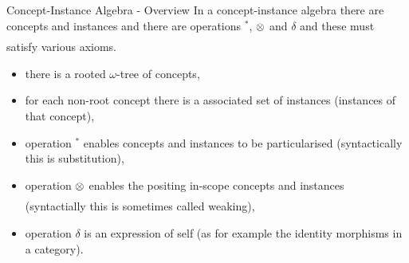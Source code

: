 \begin{frame}{Concept-Instance Algebra -  Overview}
In a concept-instance algebra there are concepts and instances and there are operations $^*$, $\underset{}{\otimes}$ and $\delta$
and these must satisfy various axioms.
\begin{itemize}
\item there is a rooted $\omega$-tree of concepts,
\item for each non-root concept there is a associated set of instances (instances of that concept),
\item operation $^*$ enables  concepts and instances to be particularised (syntactically this is substitution),
\item  operation $\underset{}{\otimes}$ enables the positing in-scope concepts and instances (syntactially this is sometimes called weaking),
\item operation $\delta$ is an expression of self (as for example the identity morphisms in a category).
\end{itemize}
\end{frame}

